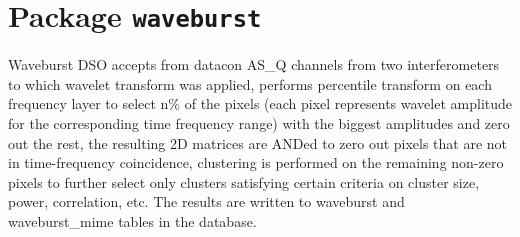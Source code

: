 \chapter{Package \texttt{waveburst}}

Waveburst DSO accepts from datacon AS\_Q channels from two interferometers
to which wavelet transform
was applied, performs percentile transform on each frequency layer to
select n\% of the pixels (each pixel represents wavelet amplitude 
for the corresponding time frequency range) with the biggest amplitudes and
zero out the rest, the resulting 2D matrices are ANDed to zero out pixels that
are not in time-frequency coincidence, clustering is performed on the remaining
non-zero pixels to further select only clusters satisfying certain
criteria on cluster size, power, correlation, etc. The results are written
to waveburst and waveburst\_mime tables in the database.

\newpage
